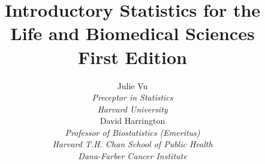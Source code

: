 

\title{\huge Introductory Statistics for the \\ Life and Biomedical Sciences\vspace{1.5mm} \\
    \Large First Edition}


\author{Julie Vu \\
\small\emph{Preceptor in Statistics} \\
\small\emph{Harvard University} \vspace{6mm} \\
David Harrington \\
\small\emph{Professor of Biostatistics (Emeritus)} \\
\small\emph{Harvard T.H. Chan School of Public Health} \\
\small\emph{Dana-Farber Cancer Institute}}


